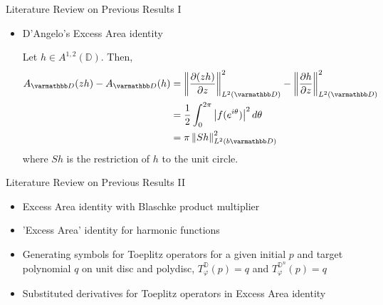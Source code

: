 \documentclass{reu_beamer}
\begin{document}
\begin{frame}{Literature Review on Previous Results I}
    \begin{itemize}
        \item D'Angelo's Excess Area identity \cite{d2019hermitian}\newline
        
    Let $h\in A^{1,2}(\mathbb{D})$. Then,
    \begin{align*}
        A_{\mathbb{D}}(zh)-A_{\mathbb{D}}(h)&=\norm{\frac{\partial(zh)}{\partial z}}_{L^{2}(\mathbb{D})}^2 - \norm{\frac{\partial h}{\partial z}}_{L^{2}(\mathbb{D})}^2 \\
        &=\frac{1}{2}\int_0^{2\pi}\left|f(e^{i\theta})\right|^2d\theta\\
        &= \pi \norm{Sh}^2_{L^{2}(b\mathbb{D})}
    \end{align*}
    where \(Sh\) is the restriction of \(h\) to the unit circle.
    \end{itemize}
\end{frame}
\begin{frame}{Literature Review on Previous Results II}
    \begin{itemize}
        \item Excess Area identity with Blaschke product multiplier
    \item 'Excess Area' identity for harmonic functions \cite{bambico2022generalization}\newline
        \item Generating symbols for Toeplitz operators for a given initial $p$ and target polynomial $q$ on unit disc and polydisc, $T^{\mathbb{D}}_{\varphi}(p) = q$ and $T^{\mathbb{D}^n}_{\varphi}(p) = q$ \cite{AshleyAdenCelikDanielLuke2024}\newline
    \item Substituted derivatives for Toeplitz operators in Excess Area identity \cite{AshleyAdenCelikDanielLuke2024}
    \end{itemize}
\end{frame}
\end{document}
